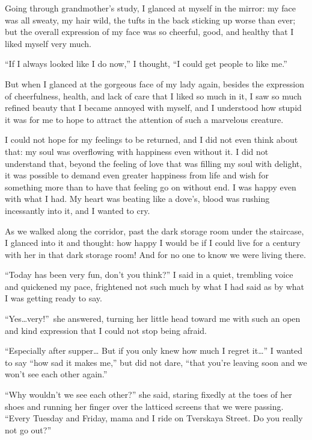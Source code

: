 Going through grandmother's study, I glanced at myself in the mirror: my face was all sweaty, my hair wild, the tufts in the back sticking up worse than ever; but the overall expression of my face was so cheerful, good, and healthy that I liked myself very much.

``If I always looked like I do now,'' I thought, ``I could get people to like me.'' %

But when I glanced at the gorgeous face of my lady again, besides the expression of cheerfulness, health, and lack of care that I liked so much in it, I saw so much refined beauty that I became annoyed with myself, and I understood how stupid it was for me to hope to attract the attention of such a marvelous creature.

I could not hope for my feelings to be returned, and I did not even think about that: my soul was overflowing with happiness even without it. I did not understand that, beyond the feeling of love that was filling my soul with delight, it was possible to demand even greater happiness from life and wish for something more than to have that feeling go on without end. I was happy even with what I had. My heart was beating like a dove's, blood was rushing incessantly into it, and I wanted to cry.

As we walked along the corridor, past the dark storage room under the staircase, I glanced into it and thought: how happy I would be if I could live for a century with her in that dark storage room! And for no one to know we were living there.

``Today has been very fun, don't you think?'' I said in a quiet, trembling voice and quickened my pace, frightened not such much by what I had said as by what I was getting ready to say. %

``Yes\ldots{}very!''~she answered, turning her little head toward me with such an open and kind expression that I could not stop being afraid. %

``Especially after supper\ldots{} But if you only knew how much I regret it\ldots{}'' I wanted to say ``how sad it makes me,'' but did not dare, ``that you're leaving soon and we won't see each other again.'' %

``Why wouldn't we see each other?'' she said, staring fixedly at the toes of her shoes and running her finger over the latticed screens that we were passing. ``Every Tuesday and Friday, mama and I ride on Tverskaya Street. Do you really not go out?'' %

